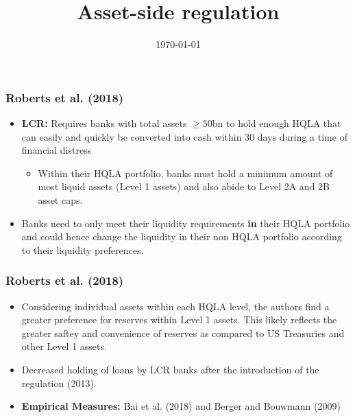 \documentclass{beamer}
\begin{document}
	
\title{Asset-side regulation}
\author{}
\date{\today}

 \renewcommand*\inserttotalframenumber{1}

\begin{frame}
\maketitle
\end{frame}


\begin{frame}
\frametitle{Roberts et al. (2018)}
\begin{itemize}
	\item \textbf{LCR:} Requires banks with total assets $\geq 50$bn to hold enough HQLA that can easily and quickly be converted into cash within 30 days during a time of financial distress
		
		\begin{itemize}
			\item Within their HQLA portfolio, banks must hold a minimum amount of most liquid assets (Level 1 assets) and also abide to Level 2A and 2B asset caps.
		\end{itemize}

	\item Banks need to only meet their liquidity requirements \textbf{in} their HQLA portfolio and could hence change the liquidity in their {non} HQLA portfolio according to their liquidity preferences.


	


\end{itemize}
\end{frame}

\begin{frame}
\frametitle{Roberts et al. (2018)}
\begin{itemize}
	

	\item Considering individual assets within each HQLA level, the authors find a greater preference for reserves within Level 1 assets. This likely reflects the greater saftey and convenience of reserves as compared to US Treasuries and other Level 1 assets.

	\item Decreased holding of loans by LCR banks after the introduction of the regulation (2013).

	\item \textbf{Empirical Measures:} Bai et al. (2018) and Berger and Bouwmann (2009) 
	

	


\end{itemize}
\end{frame}
\end{document}
